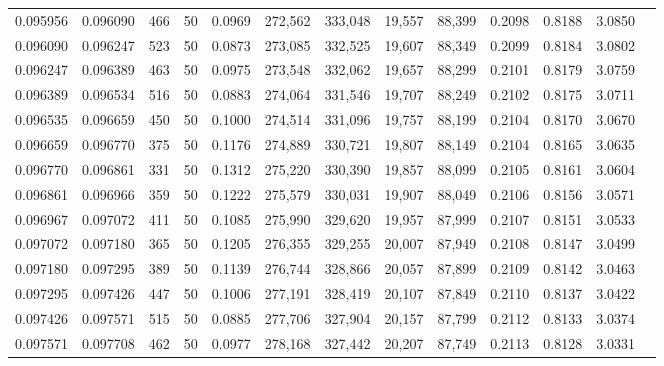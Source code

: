 \begin{tabular}{rrrrrrrrrrrrr}
0.095956 & 0.096090 &   466 &  50 &                                     0.0969 & 272,562 & 333,048 &  19,557 &  88,399 & 0.2098 & 0.8188 & 3.0850 \\
0.096090 & 0.096247 &   523 &  50 &                                     0.0873 & 273,085 & 332,525 &  19,607 &  88,349 & 0.2099 & 0.8184 & 3.0802 \\
0.096247 & 0.096389 &   463 &  50 &                                     0.0975 & 273,548 & 332,062 &  19,657 &  88,299 & 0.2101 & 0.8179 & 3.0759 \\
0.096389 & 0.096534 &   516 &  50 &                                     0.0883 & 274,064 & 331,546 &  19,707 &  88,249 & 0.2102 & 0.8175 & 3.0711 \\
0.096535 & 0.096659 &   450 &  50 &                                     0.1000 & 274,514 & 331,096 &  19,757 &  88,199 & 0.2104 & 0.8170 & 3.0670 \\
0.096659 & 0.096770 &   375 &  50 &                                     0.1176 & 274,889 & 330,721 &  19,807 &  88,149 & 0.2104 & 0.8165 & 3.0635 \\
0.096770 & 0.096861 &   331 &  50 &                                     0.1312 & 275,220 & 330,390 &  19,857 &  88,099 & 0.2105 & 0.8161 & 3.0604 \\
0.096861 & 0.096966 &   359 &  50 &                                     0.1222 & 275,579 & 330,031 &  19,907 &  88,049 & 0.2106 & 0.8156 & 3.0571 \\
0.096967 & 0.097072 &   411 &  50 &                                     0.1085 & 275,990 & 329,620 &  19,957 &  87,999 & 0.2107 & 0.8151 & 3.0533 \\
0.097072 & 0.097180 &   365 &  50 &                                     0.1205 & 276,355 & 329,255 &  20,007 &  87,949 & 0.2108 & 0.8147 & 3.0499 \\
0.097180 & 0.097295 &   389 &  50 &                                     0.1139 & 276,744 & 328,866 &  20,057 &  87,899 & 0.2109 & 0.8142 & 3.0463 \\
0.097295 & 0.097426 &   447 &  50 &                                     0.1006 & 277,191 & 328,419 &  20,107 &  87,849 & 0.2110 & 0.8137 & 3.0422 \\
0.097426 & 0.097571 &   515 &  50 &                                     0.0885 & 277,706 & 327,904 &  20,157 &  87,799 & 0.2112 & 0.8133 & 3.0374 \\
0.097571 & 0.097708 &   462 &  50 &                                     0.0977 & 278,168 & 327,442 &  20,207 &  87,749 & 0.2113 & 0.8128 & 3.0331 \\

\end{tabular}
